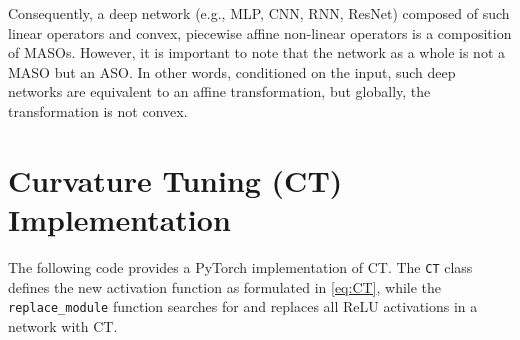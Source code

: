 Consequently, a deep network (e.g., MLP, CNN, RNN, ResNet) composed of such linear operators and convex, piecewise affine non-linear operators is a composition of MASOs. However, it is important to note that the network as a whole is not a MASO but an ASO.  In other words, conditioned on the input, such deep networks are equivalent to an affine transformation, but globally, the transformation is not convex.

\section{Curvature Tuning (CT) Implementation}\label{app:code}

The following code provides a PyTorch implementation of CT. The \texttt{CT} class defines the new activation function as formulated in \cref{eq:CT}, while the \texttt{replace\_module} function searches for and replaces all ReLU activations in a network with CT.

